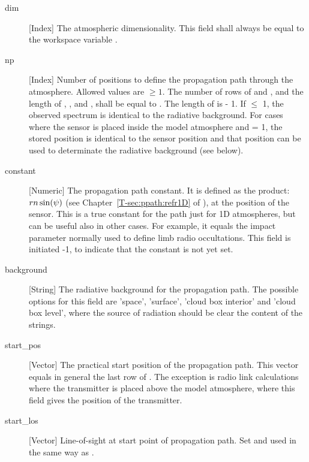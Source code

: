 \begin{description}

  \item[dim] [Index] The atmospheric dimensionality. This field shall always 
     be equal to the workspace variable .
     
   \item[np] [Index] Number of positions to define the propagation path through
     the atmosphere. Allowed values are $\geq 1$. The number of rows of
      and , and the length of ,
     ,  and , shall be
     equal to . The length of  is
      - 1. If  $\leq$ 1, the observed spectrum is
     identical to the radiative background. For cases where the sensor is
     placed inside the model atmosphere and  = 1, the stored
     position is identical to the sensor position and that position can be used
     to determinate the radiative background (see below).

   \item[constant] [Numeric] The propagation path constant. It is defined as
     the product: $r n \sin(\psi)$ (see Chapter~\ref{T-sec:ppath:refr1D}
     of \theory), at the position of the sensor. This is a true constant for
     the path just for 1D atmospheres, but can be useful also in other cases.
     For example, it equals the impact parameter normally used to define limb
     radio occultations. This field is initiated -1, to indicate that the
     constant is not yet set.

   \item[background] [String] The radiative background for the propagation
     path. The possible options for this field are 'space', 'surface', 'cloud
     box interior' and 'cloud box level', where the source of radiation
     should be clear the content of the strings.
     
   \item[start\_pos] [Vector] The practical start position of the propagation
     path. This vector equals in general the last row of . The
     exception is radio link calculations where the transmitter is placed above
     the model atmosphere, where this field gives the position of the
     transmitter.

   \item[start\_los] [Vector] Line-of-sight at start point of propagation
     path. Set and used in the same way as .


\end{description}
